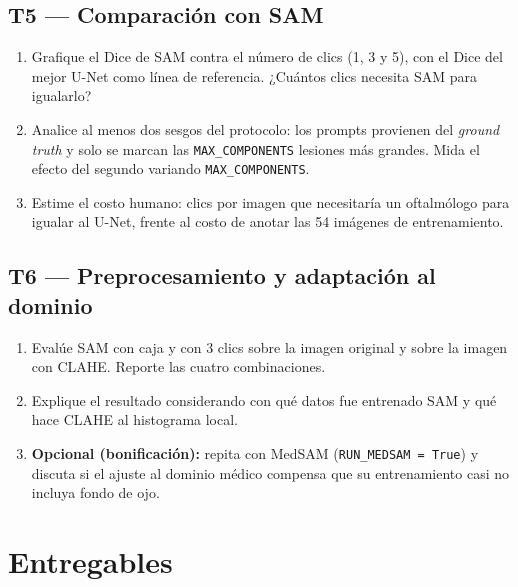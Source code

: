 \documentclass[11pt, a4paper]{article}
\newcommand{\enlace}[1]{\par\vspace{2pt}{\footnotesize\color{StanfordGray}%
	$\hookrightarrow$\  #1}}
\begin{document}
\subsection*{T5 --- Comparación con SAM}
\begin{enumerate}
	\item Grafique el Dice de SAM contra el n\'umero de clics (1, 3 y 5), con el Dice del mejor U-Net como l\'inea de referencia. ¿Cu\'antos clics necesita SAM para igualarlo?
	\item Analice al menos dos sesgos del protocolo: los prompts provienen del \emph{ground truth} y solo se marcan las \texttt{MAX\_COMPONENTS} lesiones m\'as grandes. Mida el efecto del segundo variando \texttt{MAX\_COMPONENTS}.
	\item Estime el costo humano: clics por imagen que necesitar\'ia un oftalm\'ologo para igualar al U-Net, frente al costo de anotar las 54 im\'agenes de entrenamiento.
\end{enumerate}

\subsection*{T6 --- Preprocesamiento y adaptación al dominio}
\begin{enumerate}
	\item Eval\'ue SAM con caja y con 3 clics sobre la imagen original y sobre la imagen con CLAHE. Reporte las cuatro combinaciones.
	\item Explique el resultado considerando con qu\'e datos fue entrenado SAM y qu\'e hace CLAHE al histograma local.
	\item \textbf{Opcional (bonificaci\'on):} repita con MedSAM (\texttt{RUN\_MEDSAM = True}) y discuta si el ajuste al dominio m\'edico compensa que su entrenamiento casi no incluya fondo de ojo.
\end{enumerate}

\section{Entregables}
\end{document}
